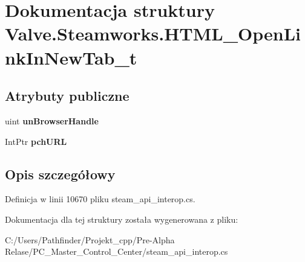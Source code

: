\hypertarget{struct_valve_1_1_steamworks_1_1_h_t_m_l___open_link_in_new_tab__t}{}\section{Dokumentacja struktury Valve.\+Steamworks.\+H\+T\+M\+L\+\_\+\+Open\+Link\+In\+New\+Tab\+\_\+t}
\label{struct_valve_1_1_steamworks_1_1_h_t_m_l___open_link_in_new_tab__t}
\subsection*{Atrybuty publiczne}
\begin{DoxyCompactItemize}
\item 
\mbox{\label{struct_valve_1_1_steamworks_1_1_h_t_m_l___open_link_in_new_tab__t_a965932495a8437389f2adf753150ee49}} 
uint {\bfseries un\+Browser\+Handle}
\item 
\mbox{\label{struct_valve_1_1_steamworks_1_1_h_t_m_l___open_link_in_new_tab__t_a6da6bd6219484e24ab29a88398ecb819}} 
Int\+Ptr {\bfseries pch\+U\+RL}
\end{DoxyCompactItemize}


\subsection{Opis szczegółowy}


Definicja w linii 10670 pliku steam\+\_\+api\+\_\+interop.\+cs.



Dokumentacja dla tej struktury została wygenerowana z pliku\+:\begin{DoxyCompactItemize}
\item 
C\+:/\+Users/\+Pathfinder/\+Projekt\+\_\+cpp/\+Pre-\/\+Alpha Relase/\+P\+C\+\_\+\+Master\+\_\+\+Control\+\_\+\+Center/steam\+\_\+api\+\_\+interop.\+cs\end{DoxyCompactItemize}
